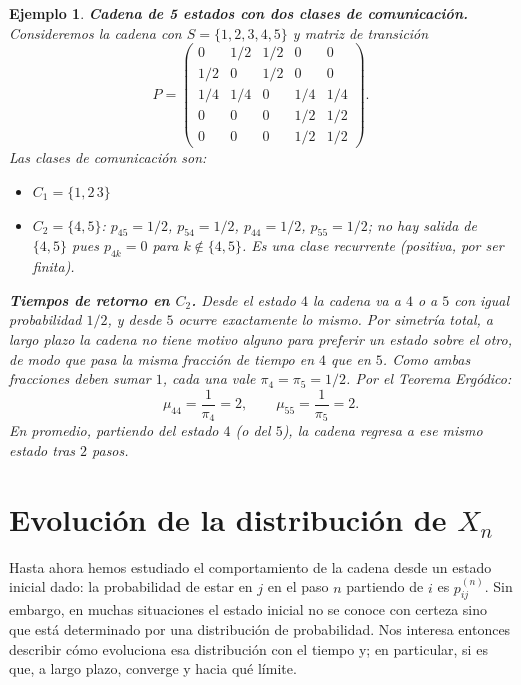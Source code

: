\documentclass[12pt]{book}
\newtheorem{example}{Ejemplo}[chapter]
\begin{document}
\begin{example}
    \textbf{Cadena de 5 estados con dos clases de comunicación.} Consideremos la cadena con $S = \{1, 2, 3, 4, 5\}$ y matriz de transición
    \[
        P = \begin{pmatrix}
            0   & 1/2 & 1/2 & 0   & 0   \\
            1/2 & 0   & 1/2 & 0   & 0   \\
            1/4 & 1/4 & 0   & 1/4 & 1/4 \\
            0   & 0   & 0   & 1/2 & 1/2 \\
            0   & 0   & 0   & 1/2 & 1/2
        \end{pmatrix}.
    \]
    Las clases de comunicación son:
    \begin{itemize}
        \item $C_1 = \{1, 2\, 3\}$
        \item $C_2 = \{4, 5\}$: $p_{45}=1/2$, $p_{54}=1/2$, $p_{44}=1/2$, $p_{55}=1/2$; no hay salida de $\{4,5\}$ pues $p_{4k}=0$ para $k\notin\{4,5\}$. Es una clase recurrente (positiva, por ser finita).
    \end{itemize}

    \textbf{Tiempos de retorno en $C_2$.} Desde el estado $4$ la cadena va a $4$ o a $5$ con igual probabilidad $1/2$, y desde $5$ ocurre exactamente lo mismo. Por simetría total, a largo plazo la cadena no tiene motivo alguno para preferir un estado sobre el otro, de modo que pasa la misma fracción de tiempo en $4$ que en $5$. Como ambas fracciones deben sumar $1$, cada una vale $\pi_4 = \pi_5 = 1/2$. Por el Teorema Ergódico:
    \[
        \mu_{44} = \frac{1}{\pi_4} = 2, \qquad \mu_{55} = \frac{1}{\pi_5} = 2.
    \]
    En promedio, partiendo del estado $4$ (o del $5$), la cadena regresa a ese mismo estado tras $2$ pasos.
\end{example}

\section{Evolución de la distribución de \texorpdfstring{$X_n$}{Xn}}

Hasta ahora hemos estudiado el comportamiento de la cadena desde un estado inicial dado: la probabilidad de estar en $j$ en el paso $n$ partiendo de $i$ es $p_{ij}^{(n)}$. Sin embargo, en muchas situaciones el estado inicial no se conoce con certeza sino que está determinado por una distribución de probabilidad. Nos interesa entonces describir cómo evoluciona esa distribución con el tiempo y; en particular, si es que, a largo plazo, converge y hacia qué límite.
\end{document}
